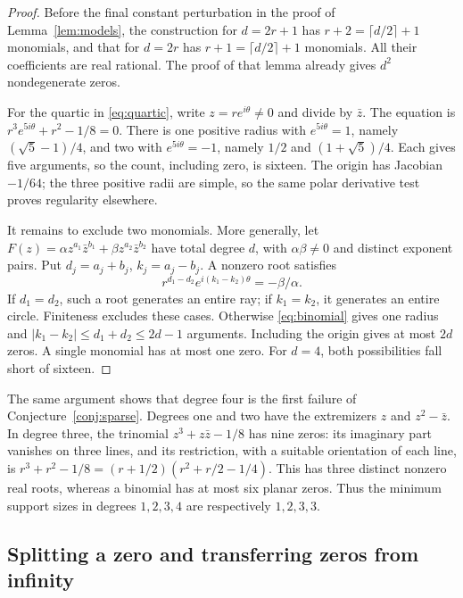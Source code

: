 \documentclass[a4paper]{amsart}
\theoremstyle{remark}
\begin{document}
\begin{proof}
Before the final constant perturbation in
the proof of Lemma~\ref{lem:models}, the construction
for \(d=2r+1\) has \(r+2=\lceil d/2\rceil+1\) monomials,
and that for \(d=2r\) has \(r+1=\lceil d/2\rceil+1\)
monomials. All their coefficients are real rational.
The proof of that lemma already gives \(d^2\)
nondegenerate zeros.

For the quartic in \eqref{eq:quartic}, write
\(z=re^{i\theta}\ne0\) and divide by \(\bar z\).
The equation is \(r^3e^{5i\theta}+r^2-1/8=0\).
There is one positive radius with \(e^{5i\theta}=1\),
namely \((\sqrt5-1)/4\), and two with
\(e^{5i\theta}=-1\), namely \(1/2\) and
\((1+\sqrt5)/4\).
Each gives five arguments, so the count, including
zero, is sixteen. The origin has Jacobian \(-1/64\);
the three positive radii are simple, so the same
polar derivative test proves regularity elsewhere.

It remains to exclude two monomials. More generally,
let
\(F(z)=\alpha z^{a_1}\bar z^{b_1}
+\beta z^{a_2}\bar z^{b_2}\)
have total degree \(d\), with \(\alpha\beta\ne0\)
and distinct exponent pairs. Put
\(d_j=a_j+b_j\), \(k_j=a_j-b_j\).
A nonzero root satisfies
\begin{equation}\label{eq:binomial}
 r^{d_1-d_2}e^{i(k_1-k_2)\theta}=-\beta/\alpha.
\end{equation}
If \(d_1=d_2\), such a root generates an entire ray;
if \(k_1=k_2\), it generates an entire circle.
Finiteness excludes these cases.
Otherwise \eqref{eq:binomial} gives one radius and
\(|k_1-k_2|\le d_1+d_2\le2d-1\) arguments.
Including the origin gives at most \(2d\) zeros.
A single monomial has at most one zero.
For \(d=4\), both possibilities fall short of sixteen.
\end{proof}

The same argument shows that degree four is the first
failure of Conjecture~\ref{conj:sparse}.
Degrees one and two have the extremizers \(z\) and
\(z^2-\bar z\). In degree three, the trinomial
\(z^3+z\bar z-1/8\) has nine zeros: its imaginary part
vanishes on three lines, and its restriction, with a suitable
orientation of each line, is
\(r^3+r^2-1/8=(r+1/2)(r^2+r/2-1/4)\).
This has three distinct nonzero real roots, whereas a binomial
has at most six planar zeros.
Thus the minimum support sizes in degrees \(1,2,3,4\)
are respectively \(1,2,3,3\).

\subsection{Splitting a zero and transferring zeros from infinity}
\end{document}
